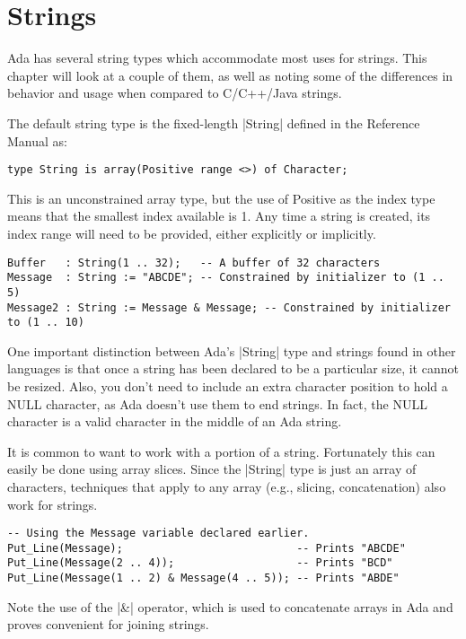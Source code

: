 \section{Strings}

Ada has several string types which accommodate most uses for strings. This chapter will look at
a couple of them, as well as noting some of the differences in behavior and usage when compared
to C/C++/Java strings.

The default string type is the fixed-length |String| defined in the Reference Manual as:

\begin{lstlisting}
type String is array(Positive range <>) of Character;
\end{lstlisting}

\noindent This is an unconstrained array type, but the use of Positive as the index type means
that the smallest index available is 1. Any time a string is created, its index range will need
to be provided, either explicitly or implicitly.

\begin{lstlisting}
Buffer   : String(1 .. 32);   -- A buffer of 32 characters
Message  : String := "ABCDE"; -- Constrained by initializer to (1 .. 5)
Message2 : String := Message & Message; -- Constrained by initializer to (1 .. 10)
\end{lstlisting}

One important distinction between Ada's |String| type and strings found in other languages is
that once a string has been declared to be a particular size, it cannot be resized. Also, you
don't need to include an extra character position to hold a NULL character, as Ada doesn't use
them to end strings. In fact, the NULL character is a valid character in the middle of an Ada
string.

It is common to want to work with a portion of a string. Fortunately this can easily be done
using array slices. Since the |String| type is just an array of characters, techniques that
apply to any array (e.g., slicing, concatenation) also work for strings.

\begin{lstlisting}
-- Using the Message variable declared earlier.
Put_Line(Message);                           -- Prints "ABCDE"
Put_Line(Message(2 .. 4));                   -- Prints "BCD"
Put_Line(Message(1 .. 2) & Message(4 .. 5)); -- Prints "ABDE"
\end{lstlisting}

\noindent Note the use of the |&| operator, which is used to concatenate arrays in Ada and
proves convenient for joining strings.

